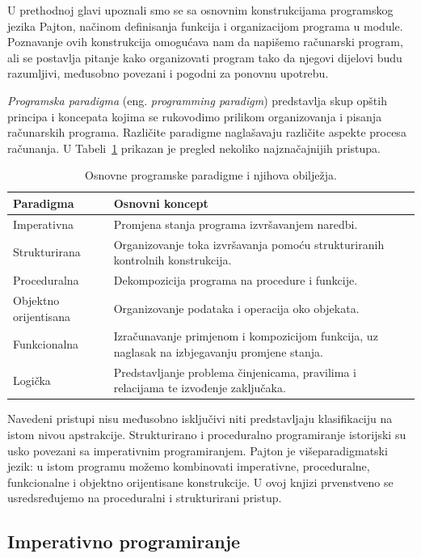 U prethodnoj glavi upoznali smo se sa osnovnim konstrukcijama programskog jezika Pajton, načinom definisanja funkcija i organizacijom programa u module. Poznavanje ovih konstrukcija omogućava nam da napišemo računarski program, ali se postavlja pitanje kako organizovati program tako da njegovi dijelovi budu razumljivi, međusobno povezani i pogodni za ponovnu upotrebu.

\textit{Programska paradigma} (eng. \textit{programming paradigm}) predstavlja skup opštih principa i koncepata kojima se rukovodimo prilikom organizovanja i pisanja računarskih programa. Različite paradigme naglašavaju različite aspekte procesa računanja. U Tabeli~\ref{tab:programske-paradigme} prikazan je pregled nekoliko najznačajnijih pristupa.

\begin{table}[H]
\centering
\caption{Osnovne programske paradigme i njihova obilježja.}
\label{tab:programske-paradigme}
\small
\begin{tabular}{|p{}|p{}|}
\hline
\textbf{Paradigma} & \textbf{Osnovni koncept} \\ \hline
Imperativna & Promjena stanja programa izvršavanjem naredbi. \\ \hline
Strukturirana & Organizovanje toka izvršavanja pomoću strukturiranih kontrolnih konstrukcija. \\ \hline
Proceduralna & Dekompozicija programa na procedure i funkcije. \\ \hline
Objektno orijentisana & Organizovanje podataka i operacija oko objekata. \\ \hline
Funkcionalna & Izračunavanje primjenom i kompozicijom funkcija, uz naglasak na izbjegavanju promjene stanja. \\ \hline
Logička & Predstavljanje problema činjenicama, pravilima i relacijama te izvođenje zaključaka. \\ \hline
\end{tabular}
\end{table}

Navedeni pristupi nisu međusobno isključivi niti predstavljaju klasifikaciju na istom nivou apstrakcije. Strukturirano i proceduralno programiranje istorijski su usko povezani sa imperativnim programiranjem. Pajton je višeparadigmatski jezik: u istom programu možemo kombinovati imperativne, proceduralne, funkcionalne i objektno orijentisane konstrukcije. U ovoj knjizi prvenstveno se usredsređujemo na proceduralni i strukturirani pristup.

\subsection{Imperativno programiranje}

